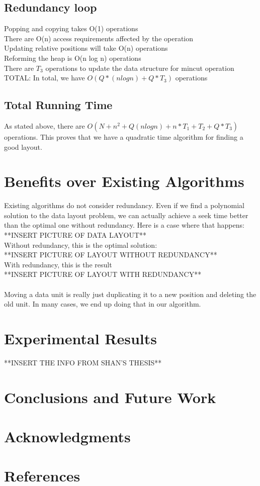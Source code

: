 \documentclass[11pt,psfig]{article}
\begin{document}
\subsection*{Redundancy loop}
	Popping and copying takes O(1) operations\\
	There are O(n) access requirements affected by the operation\\
		Updating relative positions will take O(n) operations\\
	Reforming the heap is O(n log n) operations\\
	There are $T_3$ operations to update the data structure for mincut operation\\
	TOTAL: In total, we have $O(Q*(n log n) + Q*T_3)$ operations\\

\subsection*{Total Running Time}
	As stated above, there are $O(N + n^2 + Q(n logn) + n*T_1 + T_2 + Q*T_3 )$ operations. This proves that we have a quadratic time algorithm for finding a good layout.\\

\section*{Benefits over Existing Algorithms}

Existing algorithms do not consider redundancy. Even if we find a polynomial solution to the data layout problem, we can actually achieve a seek time better than the optimal one without redundancy. Here is a case where that happens:\\
**INSERT PICTURE OF DATA LAYOUT**\\
Without redundancy, this is the optimal solution:\\
**INSERT PICTURE OF LAYOUT WITHOUT REDUNDANCY**\\
With redundancy, this is the result\\
**INSERT PICTURE OF LAYOUT WITH REDUNDANCY**\\
\\
Moving a data unit is really just duplicating it to a new position and deleting the old unit. In many cases, we end up doing that in our algorithm. 
\section*{Experimental Results}

**INSERT THE INFO FROM SHAN'S THESIS**

\section*{Conclusions and Future Work}

\section*{Acknowledgments}

\section*{References}    

\end{document}
